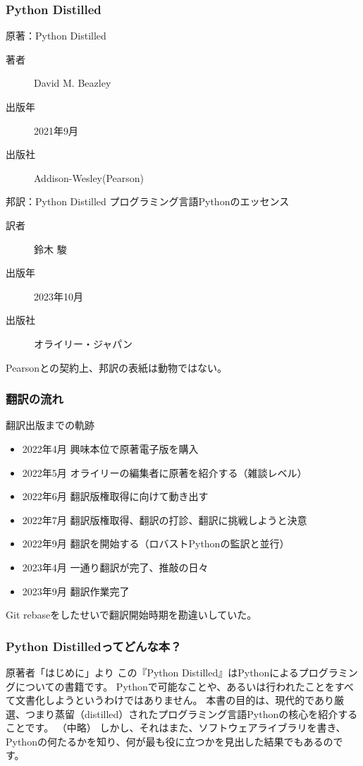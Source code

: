 \documentclass[aspectratio=169,dvipdfmx,12pt,notheorems]{beamer}
\theoremstyle{definition}
\begin{document}
\begin{frame}\frametitle{Python Distilled}

\begin{block}{原著：Python Distilled}
\begin{description}
\item[著者] David M. Beazley
\item[出版年] 2021年9月
\item[出版社] Addison-Wesley(Pearson)
\end{description}
\end{block}

\begin{block}{邦訳：Python Distilled プログラミング言語Pythonのエッセンス}
\begin{description}
\item[訳者] 鈴木 駿
\item[出版年] 2023年10月
\item[出版社] オライリー・ジャパン
\end{description}
\end{block}

Pearsonとの契約上、邦訳の表紙は動物ではない。

\end{frame}

\begin{frame}\frametitle{翻訳の流れ}

\begin{block}{翻訳出版までの軌跡}
\begin{itemize}
\item 2022年4月 興味本位で原著電子版を購入
\item 2022年5月 オライリーの編集者に原著を紹介する（雑談レベル）
\item 2022年6月 翻訳版権取得に向けて動き出す
\item 2022年7月 翻訳版権取得、翻訳の打診、翻訳に挑戦しようと決意
\item 2022年9月 翻訳を開始する（ロバストPythonの監訳と並行）
\item 2023年4月 一通り翻訳が完了、推敲の日々
\item 2023年9月 翻訳作業完了
\end{itemize}
\end{block}
Git rebaseをしたせいで翻訳開始時期を勘違いしていた。
\end{frame}

\begin{frame}\frametitle{Python Distilledってどんな本？}

\begin{block}{原著者「はじめに」より}
この『Python Distilled』はPythonによるプログラミングについての書籍です。
Pythonで可能なことや、あるいは行われたことをすべて文書化しようというわけではありません。
本書の目的は、現代的であり厳選、つまり蒸留（distilled）されたプログラミング言語Pythonの核心を紹介することです。
（中略）
しかし、それはまた、ソフトウェアライブラリを書き、Pythonの何たるかを知り、何が最も役に立つかを見出した結果でもあるのです。
\end{block}

\end{frame}
\end{document}
